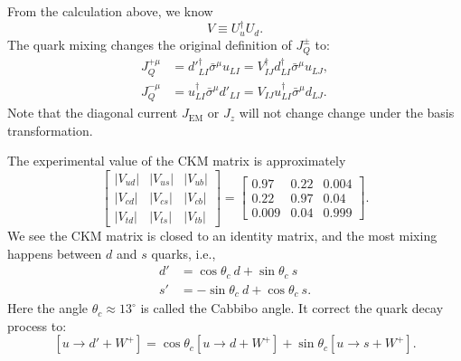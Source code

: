 \documentclass[aps,prb,superscriptaddress,nofootinbib]{revtex4}
\begin{document}
From the calculation above, we know
\begin{equation}
	V \equiv U^\dagger_u U_d.
\end{equation}
The quark mixing changes the original definition of $J^\pm_Q$ to:
\begin{equation}
\begin{aligned}
	J^{+\mu}_Q &= {d'}_{LI}^{\dagger} \bar\sigma^\mu u_{LI}
		= V^\dagger_{IJ} d_{LI}^\dagger \bar\sigma^\mu u_{LJ}, \\
	J^{-\mu}_Q &= u_{LI}^\dagger \bar\sigma^\mu d'_{LI}
		= V_{IJ} u_{LI}^\dagger \bar\sigma^\mu d_{LJ}.
\end{aligned}
\end{equation}
Note that the diagonal current $J_{\mathrm{EM}}$ or $J_z$ will not change change under the basis transformation.

The experimental value of the CKM matrix is approximately
\begin{equation}
	\begin{bmatrix}
		\left|V_{u d}\right| & \left|V_{u s}\right| & \left|V_{u b}\right| \\
		\left|V_{c d}\right| & \left|V_{c s}\right| & \left|V_{c b}\right| \\
		\left|V_{t d}\right| & \left|V_{t s}\right| & \left|V_{t b}\right|
	\end{bmatrix} =
	\begin{bmatrix}
		0.97 & 0.22 & 0.004 \\
		0.22 & 0.97 & 0.04 \\
		0.009 & 0.04 & 0.999
	\end{bmatrix}.
\end{equation}
We see the CKM matrix is closed to an identity matrix, and the most mixing happens between $d$ and $s$ quarks, i.e.,
\begin{equation}
\begin{aligned}
	d' &= \cos\theta_c\ d + \sin\theta_c\ s \\
	s' &= -\sin\theta_c\ d + \cos\theta_c\ s.
\end{aligned}
\end{equation}
Here the angle $\theta_c \approx 13^{\circ}$ is called the Cabbibo angle.
It correct the quark decay process to:
\begin{equation}
	\left[u \rightarrow d' + W^+\right]
	= \cos\theta_c \left[u \rightarrow d + W^+\right] + \sin\theta_c \left[u \rightarrow s + W^+\right].
\end{equation}
\end{document}

